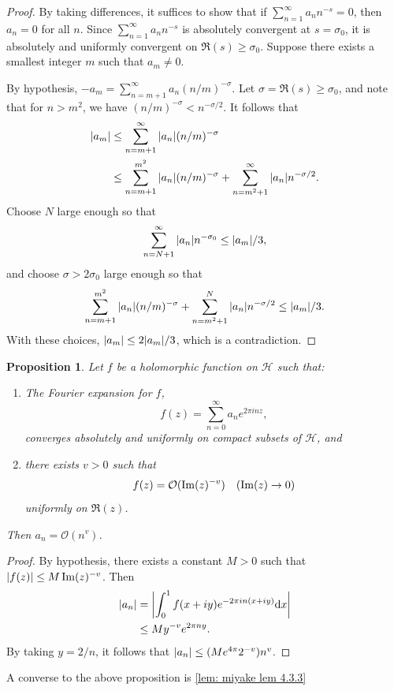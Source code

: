\documentclass[10pt,leqno,twoside]{article}
\theoremstyle{plain}
\newtheorem{proposition}[lem]{Proposition}
\theoremstyle{definition}
\numberwithin{equation}{section}
\numberwithin{lem}{section}
\begin{document}
\begin{proof}
    By taking differences, it suffices to show that if $\sum_{n=1}^\infty a_nn^{-s} = 0$, then $a_n = 0$ for all $n$. Since $\sum_{n=1}^\infty a_nn^{-s}$ is absolutely convergent at $s = \sigma_0$, it is absolutely and uniformly convergent on $\Re(s)\geq \sigma_0$. Suppose there exists a smallest integer $m$ such that $a_m \neq 0$.
    
    By hypothesis, $-a_m = \sum_{n=m+1}^\infty a_n (n/m)^{-\sigma}$. Let $\sigma = \Re(s)\geq \sigma_0$, and note that for $n>m^2$, we have $(n/m)^{-\sigma}<n^{-\sigma/2}$. It follows that
    \begin{align*}
        \abs{a_m} &\leq \sum_{n=m+1}^\infty \abs{a_n} (n/m)^{-\sigma}\\
        &\leq \sum_{n=m+1}^{m^2} \abs{a_n} (n/m)^{-\sigma} + \sum_{n=m^2+1}^\infty \abs{a_n} n^{-\sigma/2}.
    \end{align*}
    Choose $N$ large enough so that
    \[\sum_{n=N+1}^\infty \abs{a_n}n^{-\sigma_0}\leq \abs{a_m}/3,\]
    and choose $\sigma>2\sigma_0$ large enough so that 
    \[\sum_{n=m+1}^{m^2} \abs{a_n} (n/m)^{-\sigma} + \sum_{n=m^2+1}^N \abs{a_n}n^{-\sigma/2}\leq \abs{a_m}/3.\] With these choices, $\abs{a_m}\leq 2\abs{a_m}/3$, which is a contradiction.
\end{proof}
\begin{proposition}\label{prop: miyake prop pre-lemma 4.3.3}
    Let $f$ be a holomorphic function on $\mathcal H$ such that: 
    \begin{enumerate}[label = \textup{(\arabic*)}]
        \item The Fourier expansion for $f$, \[f(z) = \sum_{n=0}^\infty a_ne^{2\pi i nz},\] converges absolutely and uniformly on compact subsets of $\mathcal H$, and
        \item there exists $v>0$ such that \[f(z) = \mathcal O(\Im(z)^{-v}) \quad \textup{($\Im(z)\to 0$)}\] uniformly on $\Re(z)$. 
    \end{enumerate}
    Then $a_n = \mathcal O(n^v)$.
\end{proposition}
\begin{proof}
    By hypothesis, there exists a constant $M>0$ such that $\abs{f(z)}\leq M\Im(z)^{-v}$. Then \begin{align*}
        \abs{a_n} &= \abs{\int_0^1 f(x+iy)e^{-2\pi i n (x+iy)}\dd x}\\
        &\leq My^{-v}e^{2\pi n y}.
    \end{align*} By taking $y = 2/n$, it follows that $\abs{a_n} \leq (Me^{4\pi}2^{-v})n^v$.
\end{proof} A converse to the above proposition is \cref{lem: miyake lem 4.3.3}
\end{document}
